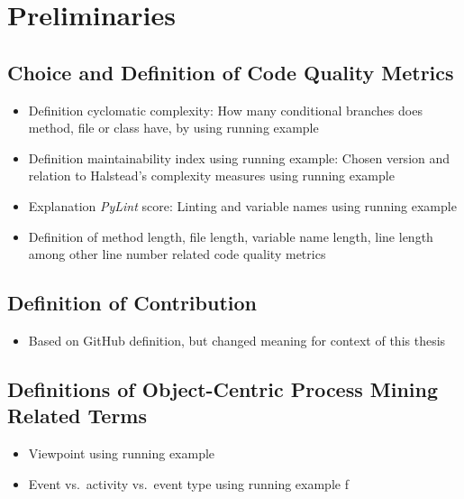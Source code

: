 \chapter{Preliminaries}
\label{chap:prelim}

\section{Choice and Definition of Code Quality Metrics}
\begin{itemize}
	\item Definition cyclomatic complexity: How many conditional branches does method, file or class have, by using running example
	\item Definition maintainability index using running example: Chosen version and relation to Halstead's complexity measures using running example
	\item Explanation \emph{PyLint} score: Linting and variable names using running example
	\item Definition of method length, file length, variable name length, line length among other line number related code quality metrics
\end{itemize}

\section{Definition of Contribution}
\begin{itemize}
	\item Based on GitHub definition, but changed meaning for context of this thesis
\end{itemize}

\section{Definitions of Object-Centric Process Mining Related Terms}
\begin{itemize}
	\item Viewpoint using running example
	\item Event vs.\ activity vs.\ event type using running example
f\end{itemize}
